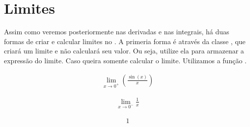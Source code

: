 \documentclass[letterpaper,10pt,english]{jupyterBook}
\begin{document}
\section{Limites}
\label{\detokenize{chapters/4:limites}}
\sphinxAtStartPar
Assim como veremos posteriormente nas derivadas e nas integrais, há duas formas de criar e calcular limites no . A primeria forma é através da classe , que criará um limite e não calculará seu valor. Ou seja, utilize ela para armazenar a expressão do limite. Caso queira somente calcular o limite. Utilizamos a função .

\begin{sphinxVerbatim}[commandchars=\\\{\}]
    
\end{sphinxVerbatim}
\begin{equation*}
\begin{split}\displaystyle \lim_{x \to 0^+}\left(\frac{\sin{\left(x \right)}}{x}\right)\end{split}
\end{equation*}
\begin{sphinxVerbatim}[commandchars=\\\{\}]
    
\end{sphinxVerbatim}
\begin{equation*}
\begin{split}\displaystyle \lim_{x \to 0^-} \frac{1}{x}\end{split}
\end{equation*}
\begin{sphinxVerbatim}[commandchars=\\\{\}]
   
\end{sphinxVerbatim}
\begin{equation*}
\begin{split}\displaystyle 1\end{split}
\end{equation*}
\end{document}
